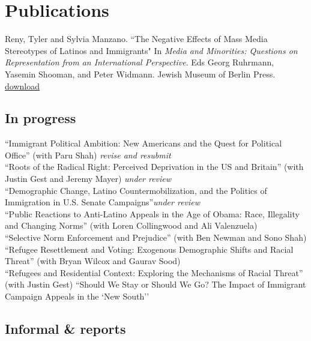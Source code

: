 \documentclass[11pt, a4paper]{article}
\newcommand{\years}[1]{\marginnote{\scriptsize #1}}
\begin{document}
\section*{Publications}

\years{2016}Reny, Tyler and Sylvia Manzano. ``The Negative Effects of Mass Media Stereotypes of Latinos and Immigrants" In \textit{Media and Minorities: Questions on Representation from an International Perspective}. Eds Georg Ruhrmann, Yasemin Shooman, and Peter Widmann. Jewish Museum of Berlin Press. \href{http://tylerreny.github.io/pdf/pubs/reny_manzano_stereotypes_2016.pdf}{download}

\subsection*{In progress}
\years{}``Immigrant Political Ambition:  New Americans and the Quest for Political Office'' (with Paru Shah) \textit{revise and resubmit} \\
\years{}``Roots of the Radical Right: Perceived Deprivation in the US and Britain'' (with Justin Gest and Jeremy Mayer) \textit{under review}\\
\years{}``Demographic Change, Latino Countermobilization, and the Politics of Immigration in U.S. Senate Campaigns''\textit{under review}\\
\years{}``Public Reactions to Anti-Latino Appeals in the Age of Obama: Race, Illegality and Changing Norms'' (with Loren Collingwood and Ali Valenzuela)\\
\years{}``Selective Norm Enforcement and Prejudice'' (with Ben Newman and Sono Shah)\\
\years{}``Refugee Resettlement and Voting: Exogenous Demographic Shifts and Racial Threat'' (with Bryan Wilcox and Gaurav Sood)\\
\years{}``Refugees and Residential Context: Exploring the Mechanisms of Racial Threat'' (with Justin Gest)
\years{}``Should We Stay or Should We Go? The Impact of Immigrant Campaign Appeals in the `New South''\\

\subsection*{Informal \& reports}
\end{document}
